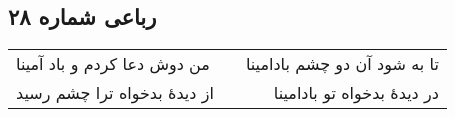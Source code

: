 \begin{center}
\section*{رباعی شماره ۲۸}
\label{sec:sh028}
\begin{longtable}{l p{0.5cm} r}
من دوش دعا کردم و باد آمینا
&&
تا به شود آن دو چشم بادامینا
\\
از دیدهٔ بدخواه ترا چشم رسید
&&
در دیدهٔ بدخواه تو بادامینا
\\
\end{longtable}
\end{center}
